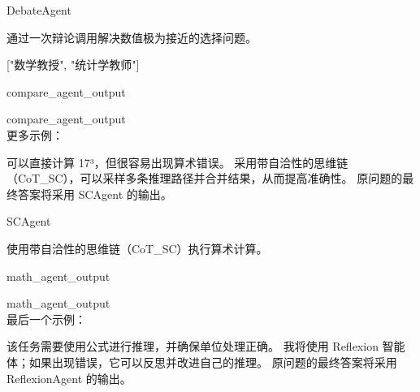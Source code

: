 \begin{userprompt}[title={用户提示词}]


\quad{}DebateAgent

\quad{}
通过一次辩论调用解决数值极为接近的选择问题。

\quad{}

\qquad{}

\qquad{}
["数学教授", "统计学教师"]

\quad{}

\quad{}
compare_agent_output


compare_agent_output\\

更多示例：\\


可以直接计算 17³，但很容易出现算术错误。
采用带自洽性的思维链（CoT\_SC），可以采样多条推理路径并合并结果，从而提高准确性。
原问题的最终答案将采用 SCAgent 的输出。



\quad{}SCAgent

\quad{}
使用带自洽性的思维链（CoT\_SC）执行算术计算。

\quad{}

\qquad{}

\quad{}

\quad{}math_agent_output


math_agent_output
\\

最后一个示例：\\


该任务需要使用公式进行推理，并确保单位处理正确。
我将使用 Reflexion 智能体；如果出现错误，它可以反思并改进自己的推理。
原问题的最终答案将采用 ReflexionAgent 的输出。


\end{userprompt}
